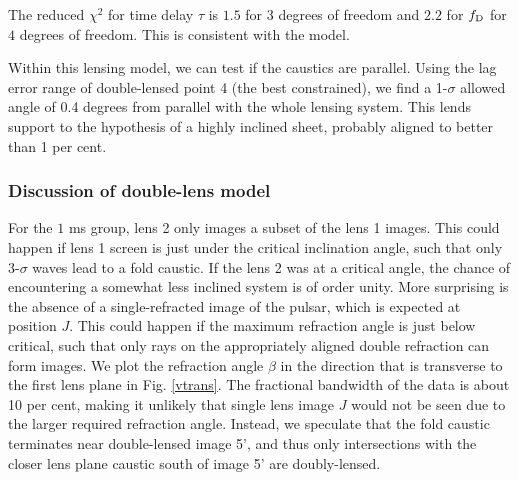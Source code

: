 \documentclass[useAMS,usenatbib]{mn2e}
\begin{document}
The reduced ${\chi}^2$ for time delay $\tau$ is $1.5$
for $3$ degrees of freedom
and $2.2$ for $f_{\rm D}$ for $4$ degrees of freedom.  This is consistent with the model.


Within this lensing model, we can test if the 
caustics are parallel.  Using the lag error range of double-lensed point 4 (the best
constrained), we find a 1-$\sigma$ allowed angle of 0.4 degrees from
parallel with the whole lensing system.  This lends support to the hypothesis of a 
highly inclined sheet, probably aligned to better than 1 per cent.




\subsubsection{Discussion of double-lens model}
\label{subsec:doublelens}
For the $1$ ms group, lens 2
only images a subset of the lens 1 images.  This could happen if
lens 1 screen is just under the critical inclination
angle, such that only 3-$\sigma$ waves lead to a fold caustic.  If the lens 2 was at a critical angle, the chance of encountering a
somewhat less inclined system is of order unity.
More surprising is the absence of a single-refracted
image of the pulsar, which is expected at position $J$.  This could
happen if the maximum refraction angle is just below critical, such
that only rays on the appropriately aligned double refraction can form
images.  
We plot the refraction angle $\beta$ in the
direction that is transverse to the first lens plane in Fig.
\ref{vtrans}.  
The fractional bandwidth of the data is about 10 per cent, making it unlikely that single lens
image $J$ would not be seen due to the larger required refraction
angle.  Instead, we speculate that the fold caustic terminates
near double-lensed image 5', and thus only intersections with the closer
lens plane caustic south of image 5' are doubly-lensed.
\end{document}
